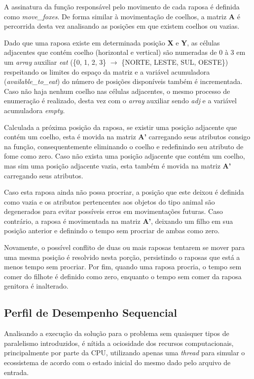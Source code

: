 \documentclass[a4paper, 12pt]{article}
\begin{document}
A assinatura da função responsável pelo movimento de cada raposa é definida como \emph{move\_foxes}. De forma similar à movimentação de coelhos, a matriz \textbf{A} é percorrida desta vez analisando as posições em que existem coelhos ou vazias. 

Dado que uma raposa existe em determinada posição \textbf{X} e \textbf{Y}, as células adjacentes que contém coelho (horizontal e vertical) são numeradas de 0 à 3 em um \emph{array} auxiliar \emph{eat} (\{0, 1, 2, 3\} \(\rightarrow\) \{NORTE, LESTE, SUL, OESTE\}) respeitando os limites do espaço da matriz e a variável acumuladora (\emph{available\_to\_eat}) do número de posições disponíveis também é incrementada. Caso não haja nenhum coelho nas células adjacentes, o mesmo processo de enumeração é realizado, desta vez com o \emph{array} auxiliar sendo \emph{adj} e a variável acumuladora \emph{empty}.

Calculada a próxima posição da raposa, se existir uma posição adjacente que contém um coelho, esta é movida na matriz \textbf{A'} carregando seus atributos consigo na função, consequentemente eliminando o coelho e redefinindo seu atributo de fome como zero. Caso não exista uma posição adjacente que contém um coelho, mas sim uma posição adjacente vazia, esta também é movida na matriz \textbf{A'} carregando seus atributos.

Caso esta raposa ainda não possa procriar, a posição que este deixou é definida como vazia e os atributos pertencentes aos objetos do tipo animal são degenerados para evitar possíveis erros em movimentações futuras. Caso contrário, a raposa é movimentada na matriz \textbf{A'}, deixando um filho em sua posição anterior e definindo o tempo sem procriar de ambas como zero. 

Novamente, o possível conflito de duas ou mais raposas tentarem se mover para uma mesma posição é resolvido nesta porção, persistindo o raposas que está a menos tempo sem procriar. Por fim, quando uma raposa procria, o tempo sem comer do filhote é definido como zero, enquanto o tempo sem comer da raposa genitora é inalterado.

\subsection{Perfil de Desempenho Sequencial}

Analisando a execução da solução para o problema sem quaisquer tipos de paralelismo introduzidos, é nítida a ociosidade dos recursos computacionais, principalmente por parte da CPU, utilizando apenas uma \emph{thread} para simular o ecossistema de acordo com o estado inicial do mesmo dado pelo arquivo de entrada.
\end{document}

